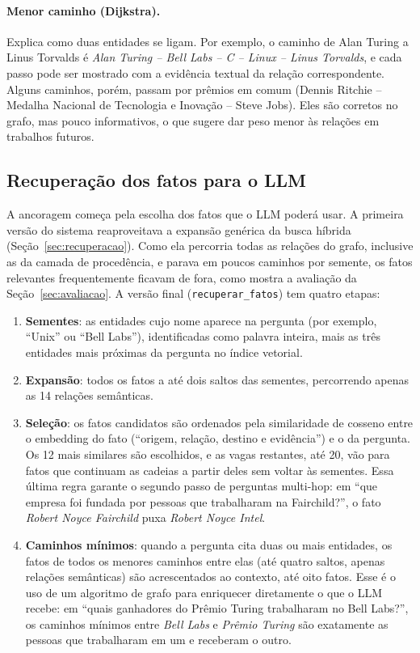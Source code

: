 \paragraph{Menor caminho (Dijkstra).} Explica como duas entidades se ligam. Por exemplo, o caminho de Alan Turing a Linus Torvalds é \emph{Alan Turing -- Bell Labs -- C -- Linux -- Linus Torvalds}, e cada passo pode ser mostrado com a evidência textual da relação correspondente. Alguns caminhos, porém, passam por prêmios em comum (Dennis Ritchie -- Medalha Nacional de Tecnologia e Inovação -- Steve Jobs). Eles são corretos no grafo, mas pouco informativos, o que sugere dar peso menor às relações  em trabalhos futuros.

\subsection{Recuperação dos fatos para o LLM}

A ancoragem começa pela escolha dos fatos que o LLM poderá usar. A primeira versão do sistema reaproveitava a expansão genérica da busca híbrida (Seção~\ref{sec:recuperacao}). Como ela percorria todas as relações do grafo, inclusive as da camada de procedência, e parava em poucos caminhos por semente, os fatos relevantes frequentemente ficavam de fora, como mostra a avaliação da Seção~\ref{sec:avaliacao}. A versão final (\texttt{recuperar\_fatos}) tem quatro etapas:

\begin{enumerate}
  \item \textbf{Sementes}: as entidades cujo nome aparece na pergunta (por exemplo, ``Unix'' ou ``Bell Labs''), identificadas como palavra inteira, mais as três entidades mais próximas da pergunta no índice vetorial.
  \item \textbf{Expansão}: todos os fatos a até dois saltos das sementes, percorrendo apenas as 14 relações semânticas.
  \item \textbf{Seleção}: os fatos candidatos são ordenados pela similaridade de cosseno entre o embedding do fato (``origem, relação, destino e evidência'') e o da pergunta. Os 12 mais similares são escolhidos, e as vagas restantes, até 20, vão para fatos que continuam as cadeias a partir deles sem voltar às sementes. Essa última regra garante o segundo passo de perguntas multi-hop: em ``que empresa foi fundada por pessoas que trabalharam na Fairchild?'', o fato \emph{Robert Noyce  Fairchild} puxa \emph{Robert Noyce  Intel}.
  \item \textbf{Caminhos mínimos}: quando a pergunta cita duas ou mais entidades, os fatos de todos os menores caminhos entre elas (até quatro saltos, apenas relações semânticas) são acrescentados ao contexto, até oito fatos. Esse é o uso de um algoritmo de grafo para enriquecer diretamente o que o LLM recebe: em ``quais ganhadores do Prêmio Turing trabalharam no Bell Labs?'', os caminhos mínimos entre \emph{Bell Labs} e \emph{Prêmio Turing} são exatamente as pessoas que trabalharam em um e receberam o outro.
\end{enumerate}


